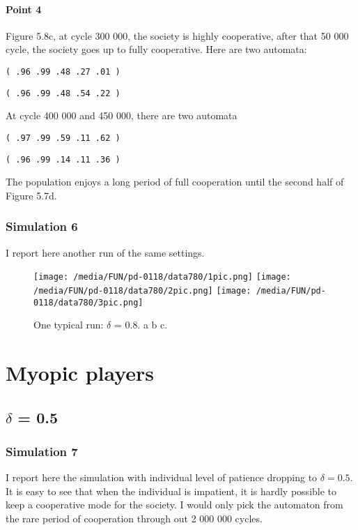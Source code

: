 \documentclass[12.5pt]{report}
\begin{document}
\paragraph{Point 4}

Figure 5.8c, at cycle 300 000, the society is highly cooperative, after that 50 000 cycle, the society goes up to fully cooperative. Here are two automata:

\begin{verbatim}
( .96 .99 .48 .27 .01 )
\end{verbatim}

\begin{verbatim}
( .96 .99 .48 .54 .22 )
\end{verbatim}

At cycle 400 000 and 450 000, there are two automata

\begin{verbatim}
( .97 .99 .59 .11 .62 )
\end{verbatim}

\begin{verbatim}
( .96 .99 .14 .11 .36 )
\end{verbatim}

The population enjoys a long period of full cooperation until the second half of Figure 5.7d.

\subsubsection{Simulation 6}

I report here another run of the same settings.

\begin{figure}[h!]
\texttt{[image: /media/FUN/pd-0118/data780/1pic.png]}
\texttt{[image: /media/FUN/pd-0118/data780/2pic.png]}
\texttt{[image: /media/FUN/pd-0118/data780/3pic.png]}
\caption{One typical run: $\delta$ = 0.8. a b c.}
\end{figure}

\section{Myopic players}

\subsection{$\delta$ = 0.5}

\subsubsection{Simulation 7}
I report here the simulation with individual level of patience dropping to $\delta = 0.5$. It is easy to see that when the individual is impatient, it is hardly possible to keep a cooperative mode for the society. I would only pick the automaton from the rare period of cooperation through out 2 000 000 cycles.
\end{document}
